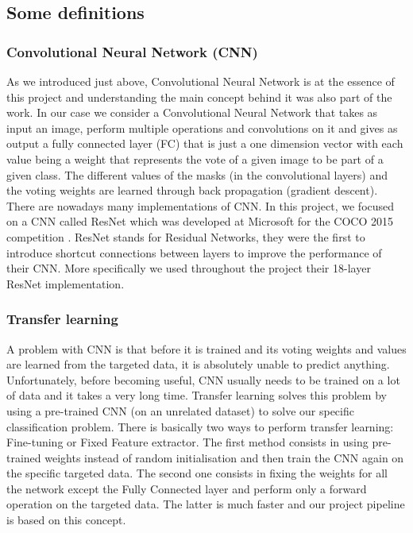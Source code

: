 \documentclass[a4paper]{article}
\begin{document}
	\subsection*{Some definitions}
		\subsubsection*{Convolutional Neural Network (CNN)}
		
		As we introduced just above, Convolutional Neural Network is at the essence of this project and understanding the main concept behind it was also part of the work. In our case we consider a Convolutional Neural Network that takes as input an image, perform multiple operations and convolutions on it and gives as output a fully connected layer (FC) that is just a one dimension vector with each value being a weight that represents the vote of a given image to be part of a given class. The different values of the masks (in the convolutional layers) and the voting weights are learned through back propagation (gradient descent). There are nowadays many implementations of CNN. In this project, we focused on a CNN called ResNet which was developed at Microsoft for the COCO 2015 competition \cite{resnet}. ResNet stands for Residual Networks, they were the first to introduce shortcut connections between layers to improve the performance of their CNN. More specifically we used throughout the project their 18-layer ResNet implementation.
		
		\subsubsection*{Transfer learning}
		
		A problem with CNN is that before it is trained and its voting weights and values are learned from the targeted data, it is absolutely unable to predict anything. Unfortunately, before becoming useful, CNN usually needs to be trained on a lot of data and it takes a very long time. Transfer learning solves this problem by using a pre-trained CNN (on an unrelated dataset) to solve our specific classification problem. There is basically two ways to perform transfer learning: Fine-tuning or Fixed Feature extractor. The first method consists in using pre-trained weights instead of random initialisation and then train the CNN again on the specific targeted data. The second one consists in fixing the weights for all the network except the Fully Connected layer and perform only a forward operation on the targeted data. The latter is much faster and our project pipeline is based on this concept.
\end{document}
